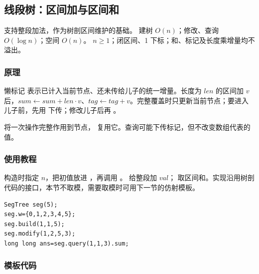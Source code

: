 \subsection{线段树：区间加与区间和}
\label{ds:seg-lazy}
\AlgorithmInfo
    {支持整段加法，作为树剖区间维护的基础。}
    {建树 $O(n)$；修改、查询 $O(\log n)$；空间 $O(n)$。}
    {$n\ge1$；闭区间、1 下标；和、标记及长度乘增量均不溢出。}
\subsubsection*{原理}
懒标记  表示已计入当前节点、还未传给儿子的统一增量。长度为 $len$ 的区间加 $v$ 后，$sum\gets sum+len\cdot v$、$tag\gets tag+v$。完整覆盖时只更新当前节点；要进入儿子前，先用  下传；修改儿子后再 。

 将一次操作完整作用到节点， 复用它。查询可能下传标记，但不改变数组代表的值。

\subsubsection*{使用教程}
构造时指定 $n$，把初值放进 ，再调用 。 给整段加 $val$； 取区间和。实现沿用树剖代码的接口，本节不取模，需要取模时可用下一节的仿射模板。
\begin{lstlisting}[style=mtycpp,numbers=none]
SegTree seg(5);
seg.w={0,1,2,3,4,5};
seg.build(1,1,5);
seg.modify(1,2,5,3);
long long ans=seg.query(1,1,3).sum;
\end{lstlisting}
\subsubsection*{模板代码}
